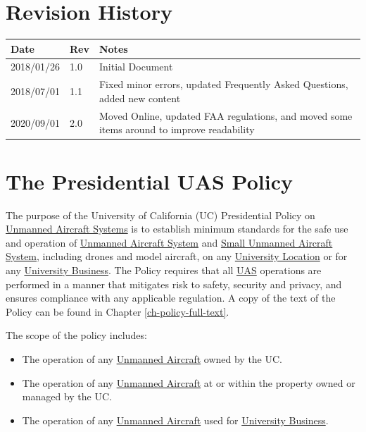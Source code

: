 \documentclass[
]{book}
\providecommand{\tightlist}{%
  \setlength{\itemsep}{0pt}\setlength{\parskip}{0pt}}
\begin{document}
\hypertarget{revision-history}{%
\chapter*{Revision History}\label{revision-history}}

\begin{longtable}[]{@{}lll@{}}
\toprule
Date & Rev & Notes\tabularnewline
\midrule
\endhead
2018/01/26 & 1.0 & Initial Document\tabularnewline
2018/07/01 & 1.1 & Fixed minor errors, updated Frequently Asked Questions, added new content\tabularnewline
2020/09/01 & 2.0 & Moved Online, updated FAA regulations, and moved some items around to improve readability\tabularnewline
\bottomrule
\end{longtable}

\hypertarget{ch-policy}{%
\chapter{The Presidential UAS Policy}\label{ch-policy}}

The purpose of the University of California (UC) Presidential Policy on \protect\hyperlink{UAS}{Unmanned Aircraft Systems} is to establish minimum standards for the safe use and operation of \protect\hyperlink{UAS}{Unmanned Aircraft System} and \protect\hyperlink{sUAS}{Small Unmanned Aircraft System}, including drones and model aircraft, on any \protect\hyperlink{UL}{University Location} or for any \protect\hyperlink{UB}{University Business}. The Policy requires that all \protect\hyperlink{UAS}{UAS} operations are performed in a manner that mitigates risk to safety, security and privacy, and ensures compliance with any applicable regulation. A copy of the text of the Policy can be found in Chapter \ref{ch-policy-full-text}.

The scope of the policy includes:

\begin{itemize}
\tightlist
\item
  The operation of any \protect\hyperlink{UA}{Unmanned Aircraft} owned by the UC.
\item
  The operation of any \protect\hyperlink{UA}{Unmanned Aircraft} at or within the property owned or managed by the UC.
\item
  The operation of any \protect\hyperlink{UA}{Unmanned Aircraft} used for \protect\hyperlink{UB}{University Business}.
\end{itemize}
\end{document}
